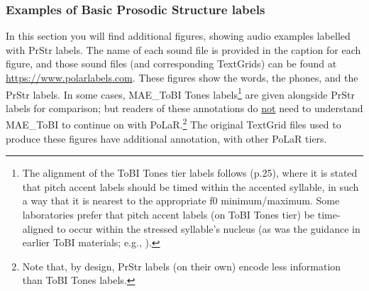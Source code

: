 \documentclass[11pt, twoside]{memoir}
\begin{document}
\subsubsection{Examples of Basic Prosodic Structure labels}\label{sec:more-examples}
In this section you will find additional figures, showing audio examples labelled with PrStr labels. The name of each sound file is provided in the caption for each figure, and those sound files (and corresponding TextGrids) can be found at \url{https://www.polarlabels.com}. These figures show the words, the phones, and the PrStr labels. In some cases, MAE\_ToBI Tones labels\footnote{The alignment of the ToBI Tones tier labels follows \citealt{beckman-05} (p.25), where it is stated that pitch accent labels should be timed within the accented syllable, in such a way that it is nearest to the appropriate f0 minimum\slash maximum. Some laboratories prefer that pitch accent labels (on ToBI Tones tier) be time-aligned to occur within the stressed syllable’s nucleus (as was the guidance in earlier ToBI materials; e.g., \citealt{beckmanhirschberg94}).} are given alongside PrStr labels for comparison; but readers of these annotations do \uline{not} need to understand MAE\_ToBI to continue on with PoLaR.\footnote{Note that, by design, PrStr labels (on their own) encode less information than ToBI Tones labels.} The original TextGrid files used to produce these figures have additional annotation, with other PoLaR tiers.
\end{document}
